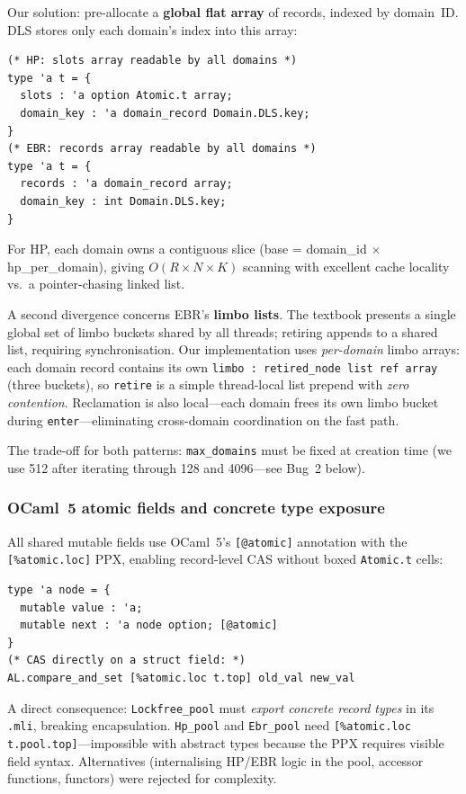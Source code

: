 \documentclass[11pt,a4paper]{article}
\begin{document}
Our solution: pre-allocate a \textbf{global flat array} of records, indexed by
domain~ID.  DLS stores only each domain's index into this array:

\begin{lstlisting}
(* HP: slots array readable by all domains *)
type 'a t = {
  slots : 'a option Atomic.t array;
  domain_key : 'a domain_record Domain.DLS.key;
}
(* EBR: records array readable by all domains *)
type 'a t = {
  records : 'a domain_record array;
  domain_key : int Domain.DLS.key;
}
\end{lstlisting}

For HP, each domain owns a contiguous slice
(base = domain\_id $\times$ hp\_per\_domain), giving $O(R \times N \times K)$
scanning with excellent cache locality vs.\ a pointer-chasing linked list.

A second divergence concerns EBR's \textbf{limbo lists}.  The textbook
presents a single global set of limbo buckets shared by all threads; retiring
appends to a shared list, requiring synchronisation.  Our implementation uses
\emph{per-domain} limbo arrays: each domain record contains its own
\texttt{limbo : retired\_node list ref array} (three buckets), so
\texttt{retire} is a simple thread-local list prepend with \emph{zero
contention}.  Reclamation is also local---each domain frees its own limbo
bucket during \texttt{enter}---eliminating cross-domain coordination on the
fast path.

The trade-off for both patterns: \texttt{max\_domains} must be fixed at
creation time (we use 512 after iterating through 128 and
4096---see Bug~2 below).

\subsubsection{OCaml~5 atomic fields and concrete type exposure}

All shared mutable fields use OCaml~5's \texttt{[@atomic]} annotation with the
\texttt{[\%atomic.loc]} PPX, enabling record-level CAS without boxed
\texttt{Atomic.t} cells:

\begin{lstlisting}
type 'a node = {
  mutable value : 'a;
  mutable next : 'a node option; [@atomic]
}
(* CAS directly on a struct field: *)
AL.compare_and_set [%atomic.loc t.top] old_val new_val
\end{lstlisting}

A direct consequence: \texttt{Lockfree\_pool} must \emph{export concrete
record types} in its \texttt{.mli}, breaking encapsulation.
\texttt{Hp\_pool} and \texttt{Ebr\_pool} need
\texttt{[\%atomic.loc t.pool.top]}---impossible with abstract types because the
PPX requires visible field syntax.  Alternatives (internalising HP/EBR logic
in the pool, accessor functions, functors) were rejected for complexity.
\end{document}
